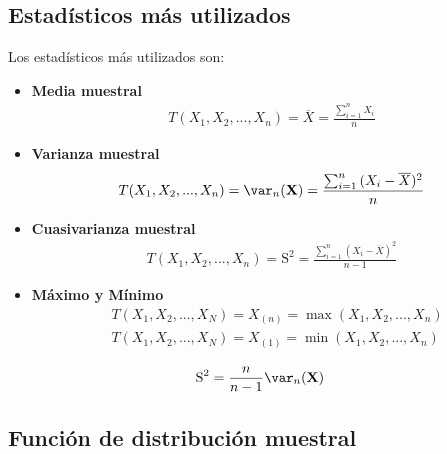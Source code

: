 \subsection{Estadísticos más utilizados}
Los estadísticos más utilizados son:
\begin{itemize}
    \item \textbf{Media muestral}
    \begin{align*}
        T(X_1,X_2, ..., X_n) = \overline{X} = \frac{\sum_{i=1}^{n}{X_i}}{n}
    \end{align*}
    \item \textbf{Varianza muestral}
    \begin{align*}
        T(X_1,X_2, ..., X_n) = \var_n(\textbf{X}) = \frac{\sum_{i=1}^{n}{(X_i - \overline{X})^2}}{n}
    \end{align*}
    \item \textbf{Cuasivarianza muestral}
    \begin{align*}
        T(X_1,X_2, ..., X_n) = \text{S}^2 = \frac{\sum_{i=1}^{n}{(X_i - \overline{X})^2}}{n-1}
    \end{align*}
    \item \textbf{Máximo y Mínimo}
    \begin{align*}
        &T(X_1,X_2, ..., X_N) = X_{(n)}=  \max(X_1, X_2, ...,X_n) \\
        &T(X_1,X_2, ..., X_N) = X_{(1)} =\min(X_1, X_2, ...,X_n)
    \end{align*}
\end{itemize}

\begin{obs}
\begin{align*}
    \text{S}^2 = \frac{n}{n-1}\var_n(\textbf{X})
\end{align*}
\end{obs}

\subsection{Función de distribución muestral}

